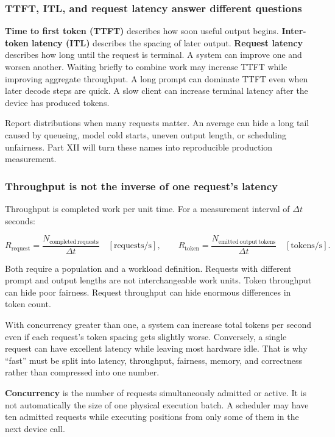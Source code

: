 \documentclass[
  10pt,
]{article}
\begin{document}
\subsubsection{TTFT, ITL, and request latency answer different
questions}\label{ttft-itl-and-request-latency-answer-different-questions}

\textbf{Time to first token (TTFT)} describes how soon useful output
begins. \textbf{Inter-token latency (ITL)} describes the spacing of
later output. \textbf{Request latency} describes how long until the
request is terminal. A system can improve one and worsen another.
Waiting briefly to combine work may increase TTFT while improving
aggregate throughput. A long prompt can dominate TTFT even when later
decode steps are quick. A slow client can increase terminal latency
after the device has produced tokens.

Report distributions when many requests matter. An average can hide a
long tail caused by queueing, model cold starts, uneven output length,
or scheduling unfairness. Part XII will turn these names into
reproducible production measurement.

\subsubsection{Throughput is not the inverse of one request's
latency}\label{throughput-is-not-the-inverse-of-one-requests-latency}

Throughput is completed work per unit time. For a measurement interval
of \(\Delta t\) seconds:

\[
R_{\mathrm{request}}
=\frac{N_{\mathrm{completed\ requests}}}{\Delta t}
\quad[\mathrm{requests/s}],
\qquad
R_{\mathrm{token}}
=\frac{N_{\mathrm{emitted\ output\ tokens}}}{\Delta t}
\quad[\mathrm{tokens/s}].
\]

Both require a population and a workload definition. Requests with
different prompt and output lengths are not interchangeable work units.
Token throughput can hide poor fairness. Request throughput can hide
enormous differences in token count.

With concurrency greater than one, a system can increase total tokens
per second even if each request's token spacing gets slightly worse.
Conversely, a single request can have excellent latency while leaving
most hardware idle. That is why ``fast'' must be split into latency,
throughput, fairness, memory, and correctness rather than compressed
into one number.

\textbf{Concurrency} is the number of requests simultaneously admitted
or active. It is not automatically the size of one physical execution
batch. A scheduler may have ten admitted requests while executing
positions from only some of them in the next device call.
\end{document}
